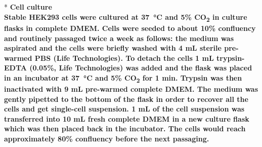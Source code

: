 \\
\\*
\bfseries{Cell culture}\\
\normalfont Stable HEK293 cells were cultured at \SI{37}{\celsius} and 5\% CO\textsubscript{2} in culture flasks in complete DMEM. Cells were seeded to about 10\% confluency and routinely passaged twice a week as follows: the medium was aspirated and the cells were briefly washed with 4 mL sterile pre-warmed PBS (Life Technologies). To detach the cells 1 mL trypsin-EDTA (0.05\%, Life Technologies) was added and the flask was placed in an incubator at \SI{37}{\celsius} and 5\% CO\textsubscript{2} for 1 min. Trypsin was then inactivated with 9 mL pre-warmed complete DMEM. The medium was gently pipetted to the bottom of the flask in order to recover all the cells and get single-cell suspension. 1 mL of the cell suspension was transferred into 10 mL fresh complete DMEM in a new culture flask which was then placed back in the incubator. The cells would reach approximately 80\% confluency before the next passaging.

